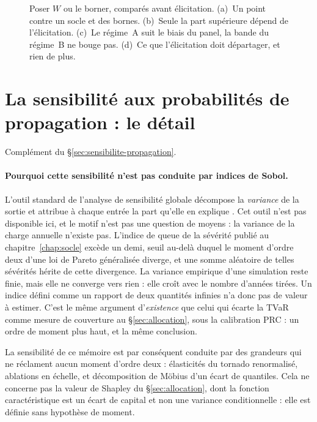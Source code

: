 \begin{figure}[htbp]
\centering
{}
\caption{Poser $W$ ou le borner, comparés avant élicitation. (a)~Un point contre un socle
et des bornes. (b)~Seule la part supérieure dépend de l'élicitation. (c)~Le régime~A suit
le biais du panel, la bande du régime~B ne bouge pas. (d)~Ce que l'élicitation doit
départager, et rien de plus.}
\label{fig:regimes}
\end{figure}

\section{La sensibilité aux probabilités de propagation : le détail}
\label{sec:ann-sensibilite-propagation}


Complément du \S\ref{sec:sensibilite-propagation}.

\paragraph{Pourquoi cette sensibilité n'est pas conduite par indices de Sobol.} L'outil
standard de l'analyse de sensibilité globale décompose la \emph{variance} de la sortie et
attribue à chaque entrée la part qu'elle en explique \citep{Owen2014, IoossPrieur2019}. Cet
outil n'est pas disponible ici, et le motif n'est pas une question de moyens : la
variance de la charge annuelle n'existe pas. L'indice de queue de la sévérité publié au
chapitre~\ref{chap:socle} excède un demi, seuil au-delà duquel le moment d'ordre deux d'une
loi de Pareto généralisée diverge, et une somme aléatoire de telles sévérités hérite de cette
divergence. La variance empirique d'une simulation reste finie, mais elle ne converge vers
rien : elle croît avec le nombre d'années tirées. Un indice défini comme un rapport de deux
quantités infinies n'a donc pas de valeur à estimer. C'est le même argument d'\emph{existence}
que celui qui écarte la TVaR comme mesure de couverture au \S\ref{sec:allocation}, sous la
calibration PRC : un ordre de moment plus haut, et la même conclusion.

La sensibilité de ce mémoire est par conséquent conduite par des grandeurs qui ne réclament
aucun moment d'ordre deux : élasticités du tornado renormalisé, ablations en échelle, et
décomposition de Möbius d'un écart de quantiles. Cela ne concerne pas la valeur de
Shapley du \S\ref{sec:allocation}, dont la fonction caractéristique est un écart de capital et
non une variance conditionnelle : elle est définie sans hypothèse de moment.

